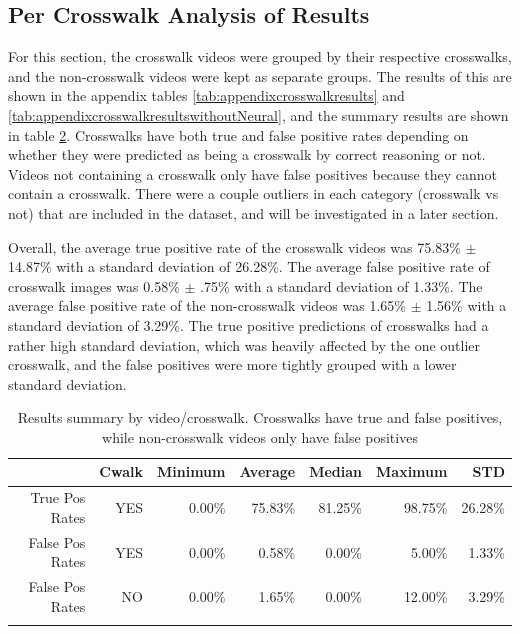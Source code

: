 \documentclass[12pt]{ucthesis}
\begin{document}
\clearpage

\subsection{Per Crosswalk Analysis of Results}

For this section, the crosswalk videos were grouped by their respective crosswalks, and the non-crosswalk videos were kept as separate groups. The results of this are shown in the appendix tables \ref{tab:appendixcrosswalkresults} and \ref{tab:appendixcrosswalkresultswithoutNeural}, and the summary results are shown in table \ref{tab:crosswalkResultsSummary}. Crosswalks have both true and false positive rates depending on whether they were predicted as being a crosswalk by correct reasoning or not. Videos not containing a crosswalk only have false positives because they cannot contain a crosswalk.  There were a couple outliers in each category (crosswalk vs not) that are included in the dataset, and will be investigated in a later section.

Overall, the average true positive rate of the crosswalk videos was 75.83\% $\pm$ 14.87\% with a standard deviation of 26.28\%. The average false positive rate of crosswalk images was 0.58\% $\pm$ .75\% with a standard deviation of 1.33\%. The average false positive rate of the non-crosswalk videos was 1.65\% $\pm$ 1.56\% with a standard deviation of 3.29\%.
The true positive predictions of crosswalks had a rather high standard deviation, which was heavily affected by the one outlier crosswalk, and the false positives were more tightly grouped with a lower standard deviation.

\begin{table}[t]
    \begin{longtable}{|r|r|r|r|r|r|r|}
    \hline
       & Cwalk & Minimum & Average & Median & Maximum & STD \bigstrut\\
    \hline
    True Pos Rates & YES & 0.00\% & 75.83\% & 81.25\% & 98.75\% & 26.28\% \bigstrut\\
    \hline
    False Pos Rates & YES & 0.00\% & 0.58\% & 0.00\% & 5.00\% & 1.33\% \bigstrut\\
    \hline
    False Pos Rates & NO & 0.00\% & 1.65\% & 0.00\% & 12.00\% & 3.29\% \bigstrut\\
    \hline

    \caption[Results summary by video/crosswalk]{Results summary by video/crosswalk. Crosswalks have true and false positives, while non-crosswalk videos only have false positives}
    \label{tab:crosswalkResultsSummary} 
    \end{longtable}
\end{table}
\end{document}
